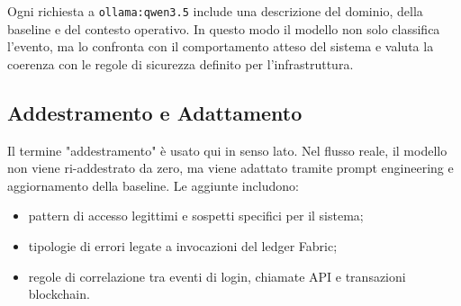 
Ogni richiesta a \texttt{ollama:qwen3.5} include una descrizione del dominio, della baseline e del contesto operativo. In questo modo il modello non solo classifica l'evento, ma lo confronta con il comportamento atteso del sistema e valuta la coerenza con le regole di sicurezza definito per l'infrastruttura.

\subsection{Addestramento e Adattamento}

Il termine "addestramento" è usato qui in senso lato. Nel flusso reale, il modello non viene ri-addestrato da zero, ma viene adattato tramite prompt engineering e aggiornamento della baseline. Le aggiunte includono:

\begin{itemize}
    \item pattern di accesso legittimi e sospetti specifici per il sistema;
    \item tipologie di errori legate a invocazioni del ledger Fabric;
    \item regole di correlazione tra eventi di login, chiamate API e transazioni blockchain.
\end{itemize}

